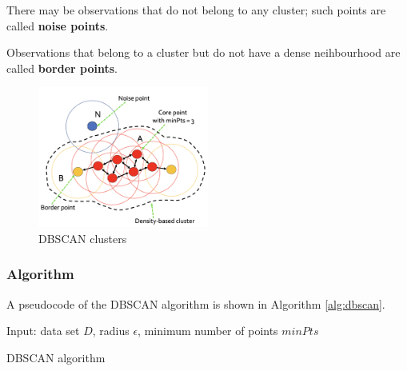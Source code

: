 There may be observations that do not belong to any cluster; such points are called \textbf{noise points}.

Observations that belong to a cluster but do not have a dense neihbourhood are called \textbf{border points}.

\begin{figure}
    \centering
    \includegraphics[width=0.5\textwidth]{./figures/chapter_7/dbscanconcepts2.png}
    \caption{DBSCAN clusters}
    \label{fig:dbscanclusters}
\end{figure}

\subsubsection*{Algorithm}
A pseudocode of the DBSCAN algorithm is shown in Algorithm \ref{alg:dbscan}.

\begin{algorithm}
    \SetAlgoLined
    Input: data set $D$, radius $\epsilon$, minimum number of points $minPts$ \\
    \caption{DBSCAN algorithm}
    \label{alg:dbscan}
\end{algorithm}